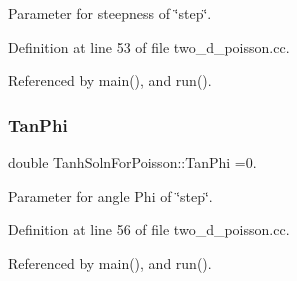 Parameter for steepness of \char`\"{}step\char`\"{}. 



Definition at line 53 of file two\+\_\+d\+\_\+poisson.\+cc.



Referenced by main(), and run().

\mbox{\label{namespaceTanhSolnForPoisson_a785ccd00a727125a5138fbbcac173294}} 
\subsubsection{\texorpdfstring{Tan\+Phi}{TanPhi}}
{\footnotesize\ttfamily double Tanh\+Soln\+For\+Poisson\+::\+Tan\+Phi =0.}



Parameter for angle Phi of \char`\"{}step\char`\"{}. 



Definition at line 56 of file two\+\_\+d\+\_\+poisson.\+cc.



Referenced by main(), and run().

